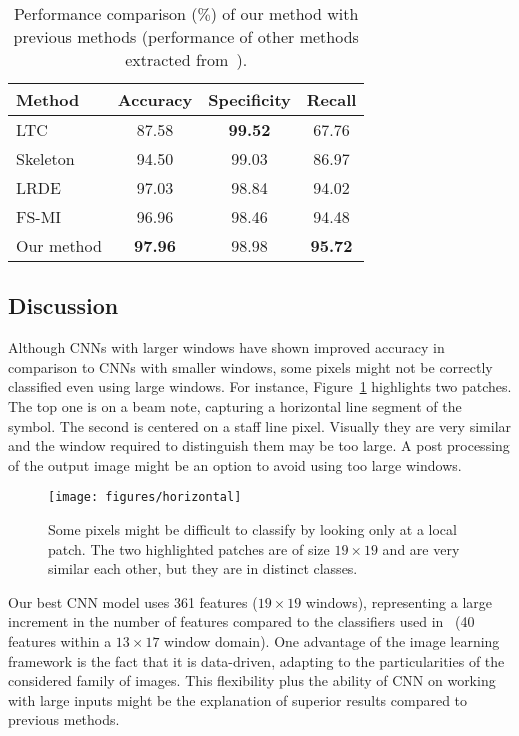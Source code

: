 \documentclass[conference]{IEEEtran}
\begin{document}
\begin{table}[h]
\caption{Performance comparison ($\%$) of our method with previous
  methods (performance of other methods extracted from~\cite{2017:IgorPR}).}
\begin{center}
\begin{tabular}{lccc}
\hline
Method & Accuracy & Specificity & Recall\\ \hline 
LTC &  87.58 & \textbf{99.52} & 67.76\\
Skeleton &  94.50 & 99.03 & 86.97\\
LRDE &  97.03 & 98.84 & 94.02 \\
FS-MI &  96.96 & 98.46 & 94.48\\
Our method &  \textbf{97.96} & 98.98 & \textbf{95.72} \\ \hline
\end{tabular}
\end{center}
\label{tab:test_results}
\end{table}



\subsection{Discussion}

Although CNNs with larger windows have shown improved accuracy 
in comparison to CNNs with smaller windows, some pixels 
might not be correctly classified even using large windows.
For instance, Figure~\ref{fig:horizontal} highlights two patches. The
top one is on a beam note, capturing a horizontal line segment of the
symbol. The second is centered on a staff line pixel. Visually they
are very similar and the window required to distinguish them may be
too large.
A post processing of the output image might be an option to avoid
using too large windows.

\begin{figure}[htb]
\centering
\texttt{[image: figures/horizontal]}
\caption{Some pixels might be difficult to classify by looking 
only at a local patch. The two highlighted patches are of size
$19\times 19$ and are very similar each other, but they are in
distinct classes.}
\label{fig:horizontal}
\end{figure}

Our best CNN model uses 361 features ($19\times 19$ windows),
representing a large increment in the number of features compared to
the classifiers used in~\cite{2017:IgorPR} (40 features within a
$13\times 17$ window domain). One advantage of the image learning
framework is the fact that it is data-driven, adapting to the
particularities of the considered family of images. This flexibility
plus the ability of CNN on working with large inputs might be the
explanation of superior results compared to previous methods. 
\end{document}
